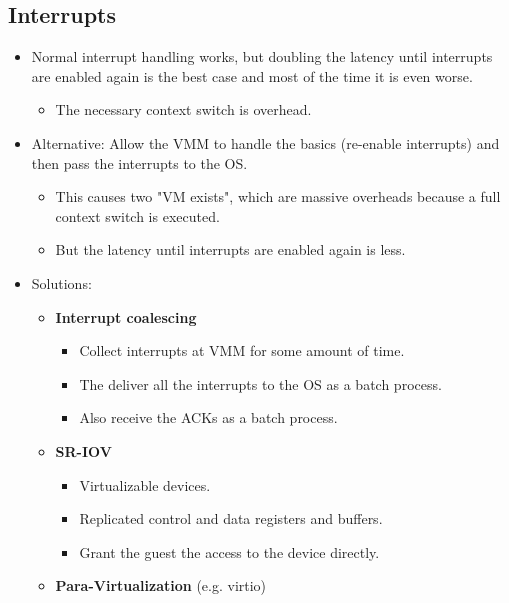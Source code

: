 \documentclass[a4paper, 11pt, accentcolor = tud3b]{tudreport}
\begin{document}
	        \subsection{Interrupts}
		        \begin{itemize}
		        	\item Normal interrupt handling works, but doubling the latency until interrupts are enabled again is the best case and most of the time it is even worse.
			        	\begin{itemize}
			        		\item The necessary context switch is overhead.
			        	\end{itemize}
		        	\item Alternative: Allow the VMM to handle the basics (re-enable interrupts) and then pass the interrupts to the OS.
			        	\begin{itemize}
			        		\item This causes two "VM exists", which are massive overheads because a full context switch is executed.
			        		\item But the latency until interrupts are enabled again is less.
			        	\end{itemize}
		        	\item Solutions:
			        	\begin{itemize}
			        		\item \textbf{Interrupt coalescing}
				        		\begin{itemize}
				        			\item Collect interrupts at VMM for some amount of time.
				        			\item The deliver all the interrupts to the OS as a batch process.
				        			\item Also receive the ACKs as a batch process.
				        		\end{itemize}
			        		\item \textbf{SR-IOV}
				        		\begin{itemize}
				        			\item Virtualizable devices.
				        			\item Replicated control and data registers and buffers.
				        			\item Grant the guest the access to the device directly.
				        		\end{itemize}
			        		\item \textbf{Para-Virtualization} (e.g. virtio)
			        	\end{itemize}
		        \end{itemize}
\end{document}
